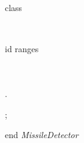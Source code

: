 \begin{vdm}{\small\sf class}
\kThreadDef
\begin{thread}
\begin{while}{\True }
\begin{blockstmt}
\begin{defstmt}
\end{defstmt} \\
\begin{setfor}{id}{ \Dom ranges}
\begin{defstmt}
\end{defstmt} \\
\If {}
\Then \\
.
\Fi
\end{setfor} ; \\
\end{blockstmt}
\end{while}
\end{thread}
{\small\sf end} {\it MissileDetector}

\end{vdm}










































































